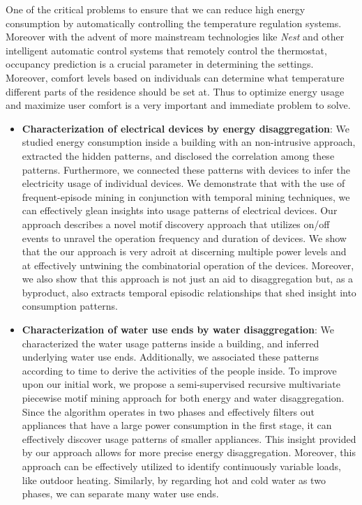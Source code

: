 One of the critical problems to ensure that we can reduce high energy consumption by automatically controlling the temperature regulation systems. Moreover with the advent of more mainstream technologies like \emph{Nest} and other intelligent automatic control systems that remotely control the thermostat, occupancy prediction is a crucial parameter in determining the settings. Moreover, comfort levels based on individuals can determine what temperature different parts of the residence should be set at. Thus to optimize energy usage and maximize user comfort is a very important and immediate problem to solve.
\fi 

\begin{itemize}
\item \textbf{Characterization of electrical devices by energy disaggregation}: We studied energy consumption inside a building with an non-intrusive approach,  extracted the hidden patterns, and disclosed the correlation among these patterns. Furthermore, we connected these patterns with devices to infer the electricity usage of individual devices. 
We demonstrate that with the use of frequent-episode mining in conjunction with temporal mining techniques, we can effectively glean insights into usage patterns of electrical devices. Our approach describes a novel motif discovery approach that utilizes on/off events to unravel the operation frequency and duration of devices. We show that the our approach is very adroit at discerning multiple power levels and at effectively untwining the combinatorial operation of the devices. Moreover, we also show that this approach is not just an aid to disaggregation but, as a byproduct, also extracts temporal episodic relationships that shed insight into consumption patterns.

\item \textbf{Characterization of water use ends by water disaggregation}: We characterized the water usage patterns inside a building, and inferred underlying water use ends. Additionally, we associated these patterns according to time to derive the activities of the people inside. 
To improve upon our initial work, we propose a semi-supervised recursive multivariate piecewise motif mining approach for both energy and water disaggregation. Since the algorithm operates in two phases and effectively filters out appliances that have a large power consumption in the first stage, it can effectively discover usage patterns of smaller appliances. This insight provided by our approach allows for more precise energy disaggregation. Moreover, this approach can be effectively utilized to identify continuously variable loads, like outdoor heating. Similarly, by regarding hot and cold water as two phases, we can separate many water use ends.  


\end{itemize}

